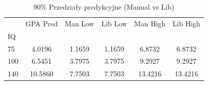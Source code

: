 \begin{table}[H]
\caption{90\% Przedziały predykcyjne (Manual vs Lib)}
\label{tab:zad2_pred}
\begin{tabular}{lccccc}
\toprule
 & GPA Pred & Man Low & Lib Low & Man High & Lib High \\
IQ &  &  &  &  &  \\
\midrule
75 & 4.0196 & 1.1659 & 1.1659 & 6.8732 & 6.8732 \\
100 & 6.5451 & 3.7975 & 3.7975 & 9.2927 & 9.2927 \\
140 & 10.5860 & 7.7503 & 7.7503 & 13.4216 & 13.4216 \\
\bottomrule
\end{tabular}
\end{table}
